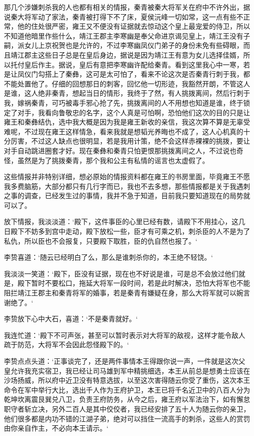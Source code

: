 那几个涉嫌刺杀我的人也都有相关的情报，秦青被秦大将军关在府中不许外出，据说秦大将军动了家法，秦青被打得下不了床，夏侯沅峰一切如常，这一点有些不正常，他的住处很严密，雍王又不便没有证据就去惊动这个皇上最宠爱的侍卫，所以不知道他暗里作些什么，靖江王郡主李寒幽是奉父命进京谒见皇上，靖江王没有子嗣，派女儿上京祝贺也是允许的，不过李寒幽凤仪门弟子的身份未免有些碍眼，而且靖江郡主这些日子总是在皇后身边，据说是因为靖江王有意为女儿选择佳婿，所以托付皇后作主。据说，皇后有意把李寒幽许配给秦青。看到这里我心中一寒，若是让凤仪门勾搭上了秦彝，这可是太可怕了，看来不论这次是否秦青行刺于我，都不能处置他了。仔细的回想那日的刺客，回忆他一切形迹，我豁然开朗，不管这人是谁，这人绝非秦青，想起当日的情形，我终于了然，有人挑拨离间，然后行刺于我，嫁祸秦青，可巧被毒手邪心抢了先，挑拨离间的人不用想也知道是谁，终于锁定了对手，我看向鲁敬忠的名字，这个人真是可怕啊，恐怕他们这次的目的只是让雍王和秦彝结仇，选中我大概是因为我是雍王新收的亲信，我这次算不算是无辜受难呢，不过现在雍王这样情急，看来我就是想韬光养晦也不成了，这人心机真的十分厉害，不过这人缺点也很明显，若是我用计策，绝不会这样赤裸裸的挑拨，要让对手自动跳进圈套才好。现在秦彝和秦青只怕更恨那挑拨离间之人，不过说也奇怪，虽然是为了挑拨秦青，那个我和公主有私情的谣言也太虚假了。

这些情报并非特别详细，想必原始的情报资料都在雍王的书房里面，毕竟雍王不愿我多费脑筋，大部分都只有几行字而已，我也不去多想，那些情报都是关于我遇刺之事的调查，已经发生过的事情，我并不急于知道，目前我只要知道现在的局势就可以了。

放下情报，我淡淡道：‘殿下，这件事臣的心里已经有数，请殿下不用挂心，这几日殿下不妨多到宫中走动，殿下放松一些，臣才有可乘之机，刺杀臣的人不是为了私仇，所以臣也不会报复，只要殿下取胜，臣的仇自然也报了。‘

李贽喜道：‘随云已经明白了么，那么是谁刺杀你的，本王绝不轻饶。‘

我淡淡一笑道：‘殿下，臣没有证据，现在也不好说是谁，可是总不会放过他们就是，殿下暂时不要松口，拖延大将军一段时间，若是此时解决，恐怕大将军也不能阻拦靖江王郡主和秦青将军的婚事，若是秦青有嫌疑在身，那么大将军就可以婉言谢绝了。‘

李贽放下心中大石，喜道：‘不是秦青就好。‘

我连忙道：‘殿下不可声张，甚至可以暂时表示对大将军的敌视，这样才能令敌人疏于防范，大将军不会因此怨怪殿下的。‘

李贽点点头道：‘正事谈完了，还是两件事情本王得跟你说一声，一件就是这次父皇允许我充实宿卫，我已经让司马雄到军中精挑细选，本王从前总是想勇士应该在沙场扬威，所以府中近卫没有特意选拔，以至这次害得随云你受了重伤，这次本王命令在军中举行大比，选出千人作为王府护卫，本王已将千名近卫中的八百人分为乾坤坎离震艮巽兑八卫，负责王府防务，从今之后，雍王府以军法治下，如有懈怠职守者斩立决，另外二百人是其中佼佼者，我已经安排了五十人为随云你的亲卫，他们很多都是内功不错的江湖子弟，绝对可以挡住一流高手的刺杀，这些人的赏罚由你亲自作主，不必向本王请示。‘

